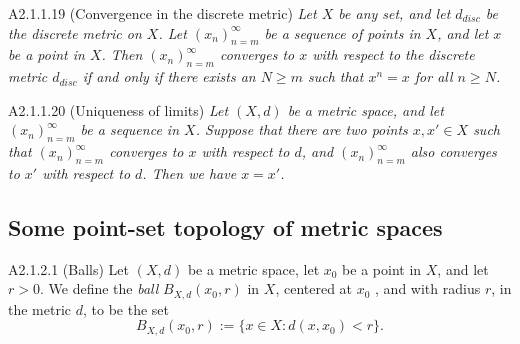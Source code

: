 
\begin{proposition}{A2.1.1.19}
    (Convergence in the discrete metric) \emph{Let $X$ be any set, and let $d_{disc}$
    be the discrete metric on $X$. Let $(x_n)_{n=m}^{\infty}$ be a sequence of points
    in $X$, and let $x$ be a point in $X$. Then $(x_n)_{n=m}^{\infty}$ converges to
    $x$ with respect to the discrete metric $d_{disc}$ if and only if there exists an
    $N \geq m$ such that $x^{n} = x$ for all $n \geq N$.}
\end{proposition}

\begin{proposition}{A2.1.1.20}
    (Uniqueness of limits) \emph{Let $(X, d)$ be a metric space, and let $(x_n)_{n=m}^{\infty}$
    be a sequence in $X$. Suppose that there are two points $x, x' \in X$ such that
    $(x_n)_{n=m}^{\infty}$ converges to $x$ with respect to $d$, and $(x_n)_{n=m}^{\infty}$
    also converges to $x'$ with respect to $d$. Then we have $x = x'$.}
\end{proposition}

\subsection{Some point-set topology of metric spaces}
\begin{definition}{A2.1.2.1}
    (Balls) Let $(X, d)$ be a metric space, let $x_0$ be a point in $X$, and let
    $r > 0$. We define the \emph{ball} $B_{X, d}(x_0, r)$ in $X$, centered at $x_0$
    , and with radius $r$, in the metric $d$, to be the set
    \begin{equation*}
        B_{X, d}(x_0, r) := \{x \in X: d(x, x_0) < r\}.
    \end{equation*}
\end{definition}

